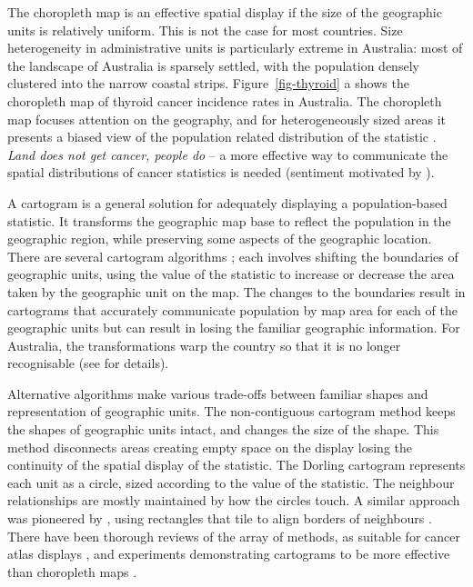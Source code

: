 \documentclass[
doublespace,
  times]{anzsauth}
\begin{document}
The choropleth map is an effective spatial display if the size of the
geographic units is relatively uniform. This is not the case for most
countries. Size heterogeneity in administrative units is particularly
extreme in Australia: most of the landscape of Australia is sparsely
settled, with the population densely clustered into the narrow coastal
strips. Figure~\ref{fig-thyroid} a shows the choropleth map of thyroid
cancer incidence rates in Australia. The choropleth map focuses
attention on the geography, and for heterogeneously sized areas it
presents a biased view of the population related distribution of the
statistic \citep{CBATCC}. \emph{Land does not get cancer, people do} --
a more effective way to communicate the spatial distributions of cancer
statistics is needed (sentiment motivated by \citet{monmonier2018how}).

A cartogram is a general solution for adequately displaying a
population-based statistic. It transforms the geographic map base to
reflect the population in the geographic region, while preserving some
aspects of the geographic location. There are several cartogram
algorithms \citep{ACTUC, CBATCC}; each involves shifting the boundaries
of geographic units, using the value of the statistic to increase or
decrease the area taken by the geographic unit on the map. The changes
to the boundaries result in cartograms that accurately communicate
population by map area for each of the geographic units but can result
in losing the familiar geographic information. For Australia, the
transformations warp the country so that it is no longer recognisable
(see \citet{KCR} for details).

Alternative algorithms make various trade-offs between familiar shapes
and representation of geographic units. The non-contiguous cartogram
method \citep{NAC} keeps the shapes of geographic units intact, and
changes the size of the shape. This method disconnects areas creating
empty space on the display losing the continuity of the spatial display
of the statistic. The Dorling cartogram \citep{ACTUC} represents each
unit as a circle, sized according to the value of the statistic. The
neighbour relationships are mostly maintained by how the circles touch.
A similar approach was pioneered by \citet{RSCW}, using rectangles that
tile to align borders of neighbours \citep{CDWCS}. There have been
thorough reviews of the array of methods, as suitable for cancer atlas
displays \citep[e.g.][]{KCR, BCM}, and experiments demonstrating
cartograms to be more effective than choropleth maps \citep{KFIF}.
\end{document}
